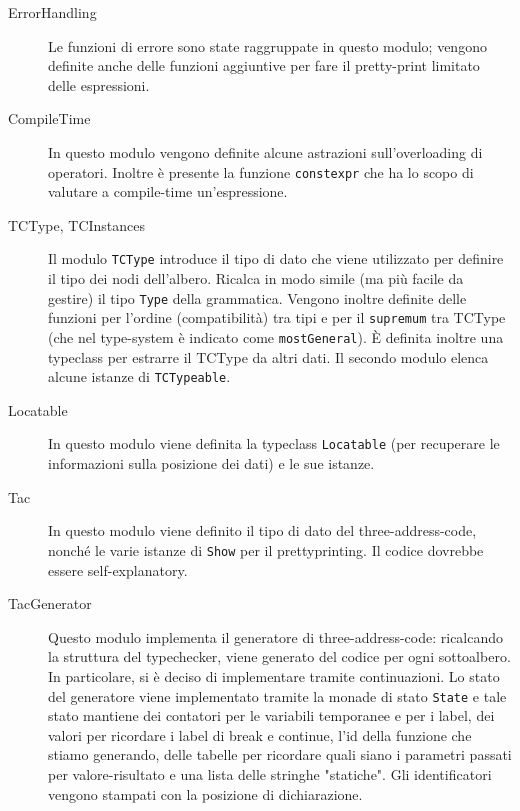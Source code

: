 \documentclass{report}
\newcommand{\term}[1]{\texttt{#1}}
\begin{document}
\begin{description}
    \item[ErrorHandling] Le funzioni di errore sono state raggruppate in questo modulo; vengono definite anche delle funzioni aggiuntive
        per fare il pretty-print limitato delle espressioni.

    \item[CompileTime] In questo modulo vengono definite alcune astrazioni sull'overloading di operatori. Inoltre è presente
        la funzione \term{constexpr} che ha lo scopo di valutare a compile-time un'espressione.

    \item[TCType, TCInstances] Il modulo \term{TCType} introduce il tipo di dato che viene utilizzato per definire il tipo
        dei nodi dell'albero. Ricalca in modo simile (ma più facile da gestire) il tipo \term{Type} della grammatica.
        Vengono inoltre definite delle funzioni per l'ordine (compatibilità) tra tipi e per il \term{supremum} tra TCType 
        (che nel type-system è indicato come \term{mostGeneral}). È definita inoltre una typeclass per estrarre il TCType
        da altri dati. Il secondo modulo elenca alcune istanze di \term{TCTypeable}.

    \item[Locatable] In questo modulo viene definita la typeclass \term{Locatable} (per recuperare le informazioni
        sulla posizione dei dati) e le sue istanze.

    \item[Tac] In questo modulo viene definito il tipo di dato del three-address-code, nonché le varie istanze
        di \term{Show} per il prettyprinting. Il codice dovrebbe essere self-explanatory.

    \item[TacGenerator] Questo modulo implementa il generatore di three-address-code: ricalcando la struttura del typechecker,
        viene generato del codice per ogni sottoalbero. In particolare, si è deciso di implementare tramite continuazioni.
        Lo stato del generatore viene implementato tramite la monade di stato \term{State} e tale stato mantiene dei contatori
        per le variabili temporanee e per i label, dei valori per ricordare i label di break e continue, l'id della funzione
        che stiamo generando, delle tabelle per ricordare quali siano i parametri passati per valore-risultato e una lista delle
        stringhe "statiche". Gli identificatori vengono stampati con la posizione di dichiarazione.

\end{description}
\end{document}
